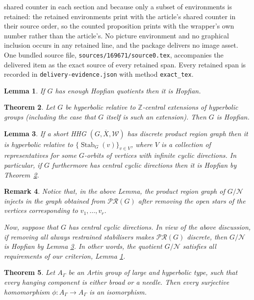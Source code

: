 \documentclass[10pt,a4paper]{amsart}
\theoremstyle{plain}
\newtheorem{thm}{Theorem}
\newtheorem{lemma}[thm]{Lemma}
\newtheorem{rem}[thm]{Remark}
\newcommand{\N}{\mathcal{N}}
\newcommand{\W}{\mathcal{W}}
\newcommand{\Z}{\mathbb{Z}}
\newcommand{\ov}[1]{\overline{#1}}
\newcommand{\Stab}[2]{\operatorname{Stab}_{#1}(#2)}
\newcommand{\good}{always restrained}
\begin{document}
shared counter in each section and because only a subset of environments is retained: the retained environments print with the article's shared counter in their source order, so the counted proposition prints with the wrapper's own number rather than the article's. No picture environment and no graphical inclusion occurs in any retained line, and the package delivers no image asset. One bundled source file, \texttt{sources/169671/source0.tex}, accompanies the delivered item as the exact source of every retained span. Every retained span is recorded in \texttt{delivery-evidence.json} with method \texttt{exact\_tex}.
\begin{lemma}
\label{lem:enough}
    If $G$ has enough Hopfian quotients then it is Hopfian.
\end{lemma}

\begin{thm}
\label{thm:rel_hyp_hopf}
    Let $G$ be hyperbolic relative to $\Z$-central extensions of hyperbolic groups (including the case that $G$ itself is such an extension). Then $G$ is Hopfian.
\end{thm}

\begin{lemma}
\label{lem:rel_hyp_check}
    If a short HHG $(G, \ov X, \W)$ has discrete product region graph then it is hyperbolic relative to $\{\Stab{G}{v}\}_{v\in V}$, where $V$ is a collection of representatives for some $G$-orbits of vertices with infinite cyclic directions. In particular, if $G$ furthermore has central cyclic directions then it is Hopfian by Theorem~\ref{thm:rel_hyp_hopf}.
\end{lemma}

\begin{rem}\label{rem:hopfian_from_good_stuff}
    Notice that, in the above Lemma, the product region graph of $G/\N$ injects in the graph obtained from $\mathcal{PR}(G)$ after removing the open stars of the vertices corresponding to $v_1,\ldots, v_r$. 
    
    Now, suppose that $G$ has central cyclic directions. In view of the above discussion, if removing all \good{} stabilisers makes $\mathcal{PR}(G)$ discrete, then $G/\N$ is Hopfian by Lemma \ref{lem:rel_hyp_check}. In other words, the quotient $G/\N$ satisfies all requirements of our criterion, Lemma \ref{lem:enough}.
\end{rem}

\begin{thm}\label{thm:XL_Hopfian}
    Let $A_\Gamma$ be an Artin group of large and hyperbolic type, such that every hanging component is either broad or a needle. 
    Then every surjective homomorphism $\phi\colon A_\Gamma\to A_\Gamma$ is an isomorphism.
\end{thm}
\end{document}
